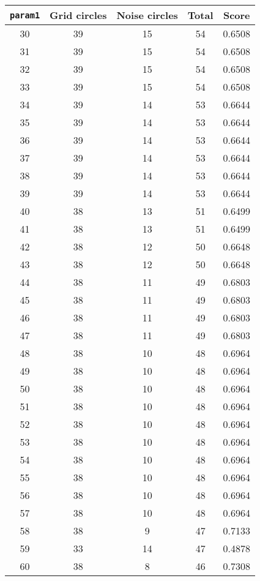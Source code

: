 \documentclass[letterpaper, 12pt]{article}
\begin{document}
\begin{longtable}{|c|c|c|c|c|}
\hline
\textbf{\texttt{param1}} & \textbf{Grid circles} & \textbf{Noise circles} & \textbf{Total} & \textbf{Score} \\
\hline
30 & 39 & 15 & 54 & 0.6508 \\
\hline
31 & 39 & 15 & 54 & 0.6508 \\
\hline
32 & 39 & 15 & 54 & 0.6508 \\
\hline
33 & 39 & 15 & 54 & 0.6508 \\
\hline
34 & 39 & 14 & 53 & 0.6644 \\
\hline
35 & 39 & 14 & 53 & 0.6644 \\
\hline
36 & 39 & 14 & 53 & 0.6644 \\
\hline
37 & 39 & 14 & 53 & 0.6644 \\
\hline
38 & 39 & 14 & 53 & 0.6644 \\
\hline
39 & 39 & 14 & 53 & 0.6644 \\
\hline
40 & 38 & 13 & 51 & 0.6499 \\
\hline
41 & 38 & 13 & 51 & 0.6499 \\
\hline
42 & 38 & 12 & 50 & 0.6648 \\
\hline
43 & 38 & 12 & 50 & 0.6648 \\
\hline
44 & 38 & 11 & 49 & 0.6803 \\
\hline
45 & 38 & 11 & 49 & 0.6803 \\
\hline
46 & 38 & 11 & 49 & 0.6803 \\
\hline
47 & 38 & 11 & 49 & 0.6803 \\
\hline
48 & 38 & 10 & 48 & 0.6964 \\
\hline
49 & 38 & 10 & 48 & 0.6964 \\
\hline
50 & 38 & 10 & 48 & 0.6964 \\
\hline
51 & 38 & 10 & 48 & 0.6964 \\
\hline
52 & 38 & 10 & 48 & 0.6964 \\
\hline
53 & 38 & 10 & 48 & 0.6964 \\
\hline
54 & 38 & 10 & 48 & 0.6964 \\
\hline
55 & 38 & 10 & 48 & 0.6964 \\
\hline
56 & 38 & 10 & 48 & 0.6964 \\
\hline
57 & 38 & 10 & 48 & 0.6964 \\
\hline
58 & 38 & 9 & 47 & 0.7133 \\
\hline
59 & 33 & 14 & 47 & 0.4878 \\
\hline
60 & 38 & 8 & 46 & 0.7308 \\

\end{longtable}
\end{document}
